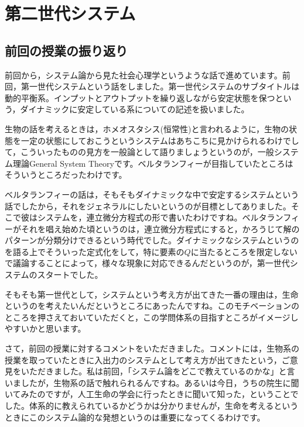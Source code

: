 \documentclass{ltjsbook}
\begin{document}
\section{第二世代システム}

\subsection{前回の授業の振り返り}

前回から，システム論から見た社会心理学というような話で進めています。前回，第一世代システムという話をしました。第一世代システムのサブタイトルは動的平衡系。インプットとアウトプットを繰り返しながら安定状態を保つという，ダイナミックに安定している系についての記述を扱いました。

生物の話を考えるときは，ホメオスタシス(恒常性)と言われるように，生物の状態を一定の状態にしておこうというシステムはあちこちに見かけられるわけでして，こういったものの見方を一般論として語りましょうというのが，一般システム理論General System Theoryです。ベルタランフィーが目指していたところはそういうところだったわけです。

ベルタランフィーの話は，そもそもダイナミックな中で安定するシステムという話でしたから，それをジェネラルにしたいというのが目標としてありました。そこで彼はシステムを，連立微分方程式の形で書いたわけですね。ベルタランフィーがそれを唱え始めた頃というのは，連立微分方程式にすると，かろうじて解のパターンが分類分けできるという時代でした。ダイナミックなシステムというのを語る上でそういった定式化をして，特に要素の$Q$に当たるところを限定しないで議論することによって，様々な現象に対応できるんだというのが，第一世代システムのスタートでした。

そもそも第一世代として，システムという考え方が出てきた一番の理由は，生命というのを考えたいんだというところにあったんですね。このモチベーションのところを押さえておいていただくと，この学問体系の目指すところがイメージしやすいかと思います。


さて，前回の授業に対するコメントをいただきました。コメントには，生物系の授業を取っていたときに入出力のシステムとして考え方が出てきたという，ご意見をいただきました。私は前回，「システム論をどこで教えているのかな」と言いましたが，生物系の話で触れられるんですね。あるいは今日，うちの院生に聞いてみたのですが，人工生命の学会に行ったときに聞いて知った，ということでした。体系的に教えられているかどうかは分かりませんが，生命を考えるというときにこのシステム論的な発想というのは重要になってくるわけです。
\end{document}
